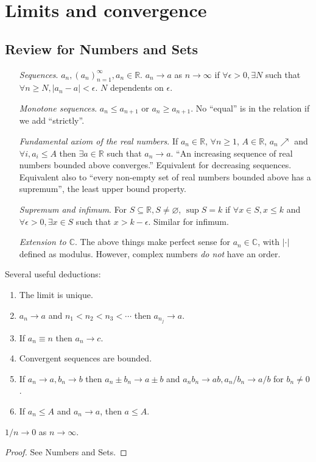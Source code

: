 \section{Limits and convergence}
\subsection{Review for Numbers and Sets}
\begin{enumerate}[align=left]
    \item[\textit{Sequences}.] $ a_n, (a_n)_{n=1}^{\infty}, a_n\in \mathbb{R}  $. $ a_n\to a $ as $n\to \infty$ if $ \forall \epsilon>0, \exists N $ such that $ \forall n\ge N, |a_n-a|<\epsilon $. $N$ dependents on $\epsilon$. 
    \item[\textit{Monotone sequences}.] $ a_n\le a_{n+1} $ or $ a_n\ge a_{n+1} $. No ``equal'' is in the relation if we add ``strictly''.
    \item[\textit{Fundamental axiom of the real numbers}.] If $ a_n\in \mathbb{R}  $, $ \forall n\ge 1 $, $A\in \mathbb{R}$, $ a_n \nearrow $ and $ \forall i, a_i\le A $ then $ \exists a\in \mathbb{R} $ such that $a_n\to a$. ``An increasing sequence of real numbers bounded above converges.'' Equivalent for decreasing sequences. Equivalent also to ``every non-empty set of real numbers bounded above has a supremum'', the least upper bound property.
    \item[\textit{Supremum and infimum}.] For $ S \subseteq \mathbb{R}, S\neq \varnothing  $, $ \sup S=k $ if $ \forall x\in S, x\le k $ and $ \forall \epsilon>0, \exists x\in S $ such that $ x>k-\epsilon $. Similar for infimum.
    \item[\textit{Extension to $\mathbb{C}$}.] The above things make perfect sense for $ a_n\in \mathbb{C} $, with $ |\cdot| $ defined as modulus. However, complex numbers \textit{do not} have an order.
\end{enumerate}

Several useful deductions:
\begin{lemma}\label{lma:1.1}
    \begin{enumerate}
        \item The limit is unique.
        \item $ a_n\to a $ and $n_1<n_2<n_3<\cdots$ then $ a_{n_j}\to a $.
        \item If $ a_n\equiv n $ then $a_n\to c$.
        \item Convergent sequences are bounded.
        \item If $ a_n\to a,b_n\to b $ then $ a_n\pm b_n\to a\pm b $ and $ a_nb_n\to ab, a_n/b_n\to a/b $ for $b_n\neq 0$.
        \item If $ a_n\le A $ and $a_n\to a$, then $a\le A$.
    \end{enumerate}
\end{lemma}
\begin{lemma}[Archimedes]\label{lma:1.2}
    $ 1/n\to 0 $ as $ n\to \infty $.
\end{lemma}
\begin{proof}
    See Numbers and Sets.
\end{proof}

